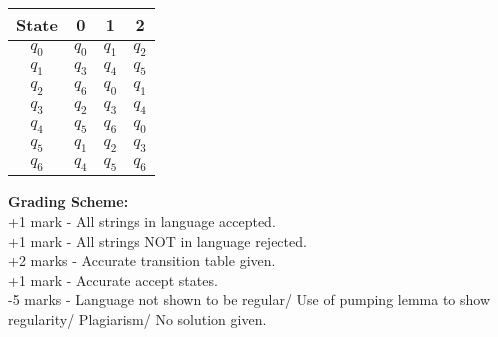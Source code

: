 \documentclass[11pt, article, oneside]{memoir}
\begin{document}
\begin{enumerate}
\begin{center}
        \end{center}
        \begin{center}
        \begin{tabular}{|c|c|c|c|} 
            \hline
            State & 0 & 1 & 2\\
            \hline
            \(q_0\) & \(q_0\) & \(q_1\) & \(q_2\)\\ 
            \hline
            \(q_1\) & \(q_3\) & \(q_4\) & \(q_5\)\\ 
            \hline
            \(q_2\) & \(q_6\) & \(q_0\) & \(q_1\)\\ 
            \hline
            \(q_3\) & \(q_2\) & \(q_3\) & \(q_4\)\\ 
            \hline
            \(q_4\) & \(q_5\) & \(q_6\) & \(q_0\)\\ 
            \hline
            \(q_5\) & \(q_1\) & \(q_2\) & \(q_3\)\\ 
            \hline
            \(q_6\) & \(q_4\) & \(q_5\) & \(q_6\)\\ 
            \hline
        \end{tabular}
        \end{center}

        \textbf{Grading Scheme:}
        \\+1 mark - All strings in language accepted.
        \\+1 mark - All strings NOT in language rejected.
        \\+2 marks - Accurate transition table given.
        \\+1 mark - Accurate accept states.
        \\-5 marks -  Language not shown to be regular/ Use of pumping lemma to show regularity/ Plagiarism/ No solution given.
        

\end{enumerate}
\end{document}
